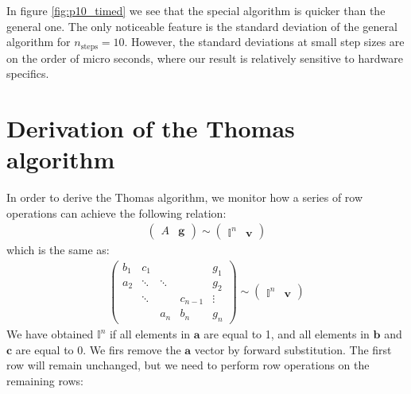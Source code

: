 \documentclass[english,notitlepage,nofootinbib]{revtex4-1}  %
\renewcommand{\vec}{\mathbf}
\begin{document}
In figure \ref{fig:p10_timed} we see that the special algorithm is quicker than the general one. The only noticeable feature is the standard deviation of the general algorithm for $n_\mathrm{steps}=10$. However, the standard deviations at small step sizes are on the order of micro seconds, where our result is relatively sensitive to hardware specifics. 

\appendix

\section{Derivation of the Thomas algorithm}\label{Apx:Thomas_algorithm}

In order to derive the Thomas algorithm, we monitor how a series of row operations can achieve the following relation:
\begin{align*}
    \begin{pmatrix}
        A & \vec{g} 
    \end{pmatrix}
    \sim 
    \begin{pmatrix}
        \mathbb{I}^n & \vec{v}
    \end{pmatrix}
\end{align*}
which is the same as:
\begin{align*}
    \begin{pmatrix}
        b_1 & c_1 & &  & g_1 \\
        a_2 & \ddots & \ddots & & g_2 \\ 
         & \ddots & & c_{n-1} & \vdots \\
          & & a_n & b_n & g_n
    \end{pmatrix}
    \sim 
    \begin{pmatrix}
        \mathbb{I}^n & \vec{v}
    \end{pmatrix}
\end{align*}
We have obtained $\mathbb{I}^n$ if all elements in $\vec{a}$ are equal to 1, and all elements in $\vec{b}$ and $\vec{c}$ are equal to 0. We firs remove the $\vec{a}$ vector by forward substitution. The first row will remain unchanged, but we need to perform row operations on the remaining rows:
\end{document}
